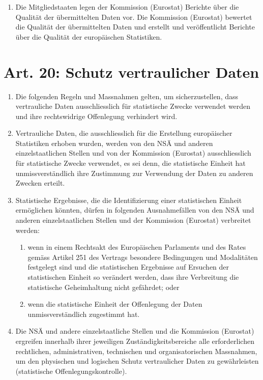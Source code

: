 \documentclass[A4, 12pt]{scrbook}
\begin{document}
\begin{enumerate}[label=(\arabic*)]
            \item Die Mitgliedstaaten legen der Kommission (Eurostat) Berichte über die Qualität der übermittelten Daten vor. Die Kommission (Eurostat) bewertet die Qualität der übermittelten Daten und erstellt und veröffentlicht Berichte über die Qualität der europäischen Statistiken.
        \end{enumerate}
    \section{Art. 20: Schutz vertraulicher Daten}
        \begin{enumerate}[label=(\arabic*)]
            \item Die folgenden Regeln und Massnahmen gelten, um sicherzustellen, dass vertrauliche Daten ausschliesslich für statistische Zwecke verwendet werden und ihre rechtswidrige Offenlegung verhindert wird.
            \item Vertrauliche Daten, die ausschliesslich für die Erstellung europäischer Statistiken erhoben wurden, werden von den NSÄ und anderen einzelstaatlichen Stellen und von der Kommission (Eurostat) ausschliesslich für statistische Zwecke verwendet, es sei denn, die statistische Einheit hat unmissverständlich ihre Zustimmung zur Verwendung der Daten zu anderen Zwecken erteilt.
            \item Statistische Ergebnisse, die die Identifizierung einer statistischen Einheit ermög\-lichen könnten, dürfen in folgenden Ausnahmefällen von den NSÄ und anderen einzelstaatlichen Stellen und der Kommission (Eurostat) verbreitet werden:
            \begin{enumerate}
                \item wenn in einem Rechtsakt des Europäischen Parlaments und des Rates gemäss Artikel 251 des Vertrags besondere Bedingungen und Modalitäten festgelegt sind und die statistischen Ergebnisse auf Ersuchen der statistischen Einheit so verändert werden, dass ihre Verbreitung die statistische Geheimhaltung nicht gefährdet; oder
                \item wenn die statistische Einheit der Offenlegung der Daten unmissverständlich zugestimmt hat.
            \end{enumerate}
            \item Die NSÄ und andere einzelstaatliche Stellen und die Kommission (Eurostat) ergreifen innerhalb ihrer jeweiligen Zuständigkeitsbereiche alle erforderlichen rechtlichen, administrativen, technischen und organisatorischen Massnahmen, um den physischen und logischen Schutz vertraulicher Daten zu gewährleisten (statistische Offenlegungskontrolle).

\end{enumerate}
\end{document}
